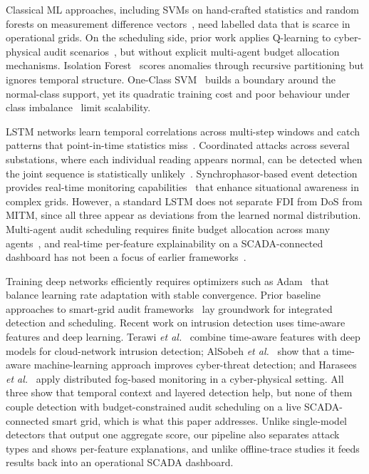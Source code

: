 \documentclass[conference,a4paper]{IEEEtran}
\begin{document}
Classical ML approaches, including SVMs on hand-crafted statistics and random forests on measurement difference vectors~\cite{b6}, need labelled data that is scarce in operational grids. On the scheduling side, prior work applies Q-learning to cyber-physical audit scenarios~\cite{b7}, but without explicit multi-agent budget allocation mechanisms. Isolation Forest~\cite{b8} scores anomalies through recursive partitioning but ignores temporal structure. One-Class SVM~\cite{b9} builds a boundary around the normal-class support, yet its quadratic training cost and poor behaviour under class imbalance~\cite{b10} limit scalability.

LSTM networks learn temporal correlations across multi-step windows and catch patterns that point-in-time statistics miss~\cite{b11}. Coordinated attacks across several substations, where each individual reading appears normal, can be detected when the joint sequence is statistically unlikely~\cite{b12}. Synchrophasor-based event detection provides real-time monitoring capabilities~\cite{b13} that enhance situational awareness in complex grids. However, a standard LSTM does not separate FDI from DoS from MITM, since all three appear as deviations from the learned normal distribution. Multi-agent audit scheduling requires finite budget allocation across many agents~\cite{b14}, and real-time per-feature explainability on a SCADA-connected dashboard has not been a focus of earlier frameworks~\cite{b15}.

Training deep networks efficiently requires optimizers such as Adam~\cite{b16} that balance learning rate adaptation with stable convergence. Prior baseline approaches to smart-grid audit frameworks~\cite{b17} lay groundwork for integrated detection and scheduling. Recent work on intrusion detection uses time-aware features and deep learning. Terawi \textit{et al.}~\cite{b18} combine time-aware features with deep models for cloud-network intrusion detection; AlSobeh \textit{et al.}~\cite{b19} show that a time-aware machine-learning approach improves cyber-threat detection; and Harasees \textit{et al.}~\cite{b20} apply distributed fog-based monitoring in a cyber-physical setting. All three show that temporal context and layered detection help, but none of them couple detection with budget-constrained audit scheduling on a live SCADA-connected smart grid, which is what this paper addresses. Unlike single-model detectors that output one aggregate score, our pipeline also separates attack types and shows per-feature explanations, and unlike offline-trace studies it feeds results back into an operational SCADA dashboard.
\end{document}
